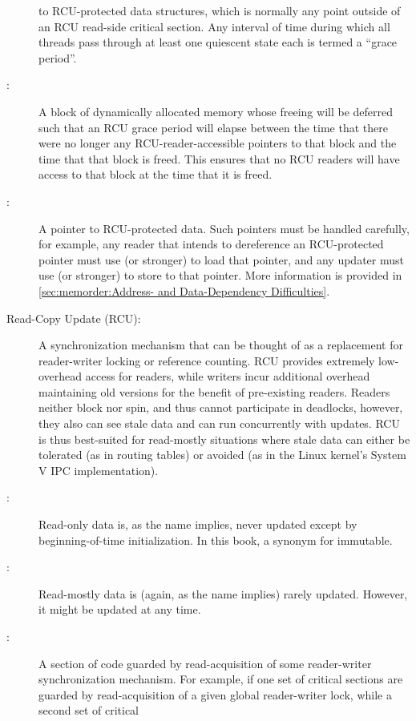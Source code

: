 \begin{description}
	to RCU-protected data structures, which is normally any point
	outside of an RCU read-side critical section.
	Any interval of time during which all threads pass through at
	least one quiescent state each is termed a ``grace period''.
\item[\IXaltr{RCU-Protected Data}{RCU-protected data}:]
	A block of dynamically allocated memory whose freeing will be
	deferred such that an RCU grace period will elapse between the
	time that there were no longer any RCU-reader-accessible pointers
	to that block and the time that that block is freed.
	This ensures that no RCU readers will have access to that block at
	the time that it is freed.
\item[\IXaltr{RCU-Protected Pointer}{RCU-protected pointer}:]
	A pointer to RCU-protected data.
	Such pointers must be handled carefully, for example, any reader
	that intends to dereference an RCU-protected pointer must
	use  (or stronger) to load that pointer,
	and any updater must use  (or stronger)
	to store to that pointer.
	More information is provided in
	\cref{sec:memorder:Address- and Data-Dependency Difficulties}.
\item[Read-Copy Update (RCU):]
	A synchronization mechanism that can be thought of as a replacement
	for reader-writer locking or reference counting.
	RCU provides extremely low-overhead access for readers, while
	writers incur additional overhead maintaining old versions
	for the benefit of pre-existing readers.
	Readers neither block nor spin, and thus cannot participate in
	deadlocks, however, they also can see stale data and can
	run concurrently with updates.
	RCU is thus best-suited for read-mostly situations where
	stale data can either be tolerated (as in routing tables)
	or avoided (as in the Linux kernel's System V IPC implementation).
\item[\IX{Read Only}:]
	Read-only data is, as the name implies, never updated except
	by beginning-of-time initialization.
	In this book, a synonym for immutable.
\item[\IX{Read Mostly}:]
	Read-mostly data is (again, as the name implies) rarely updated.
	However, it might be updated at any time.
\item[\IXh{Read-Side}{Critical Section}:]
	A section of code guarded by read-acquisition of
	some reader-writer synchronization mechanism.
	For example, if one set of critical sections are guarded by
	read-acquisition of
	a given global reader-writer lock, while a second set of critical

\end{description}

